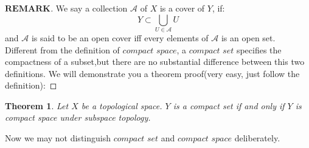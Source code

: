 \documentclass[a4paper, 11pt]{article}
\newtheorem{theorem}{Theorem}
\theoremstyle{definition}
\theoremstyle{remark}
\newenvironment{myremark}
{\renewcommand\qedsymbol{$ $}\begin{proof}[$\mathbf{REMARK}$]}
  {\end{proof}}
\theoremstyle{definition}
\begin{document}
\begin{myremark}
        We say a collection $\mathcal{A}$ of $X$ is a cover of $Y$, if:
        $$
        Y\subset \bigcup_{U\in \mathcal{A}}U
        $$ and $\mathcal{A}$ is said to be an open cover iff every elements of
        $\mathcal{A}$ is an open set.\\
        \indent Different from the definition of $\textit{compact space}$, a
        $\textit{compact set}$ specifies the compactness of a subset,but there
        are no substantial difference between this two definitions. We will
        demonstrate you a theorem proof(very easy, just follow the 
        definition):
\end{myremark}
\begin{theorem}
        Let $X$ be a topological space. $Y$ is a compact set if and only if $Y$
        is compact space under subspace topology.
\end{theorem}
\noindent
Now we may not distinguish $\textit{compact set}$ and $\textit{compact space}$ 
deliberately.
\end{document}
